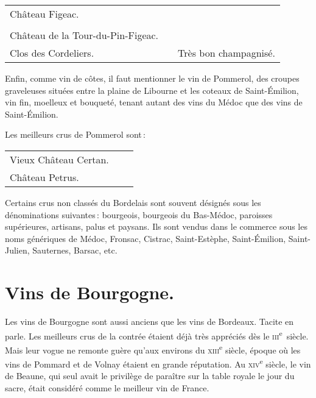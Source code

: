 \begin{longtable}{m{14em}m{8em}m{14em}}
  Château Figeac.                     &                 &                                                              \\
                                      &                 &                                                              \\
  Château de la Tour-du-Pin-Figeac.   &                 &                                                              \\
  Clos des Cordeliers.                &                 & Très bon champagnisé.                                        \\
\end{longtable}     
\normalsize

Enfin, comme vin de côtes, il faut mentionner le vin de Pommerol, des croupes
graveleuses situées entre la plaine de Libourne et les coteaux de
Saint-Émilion, vin fin, moelleux et bouqueté, tenant autant des vins du Médoc
que des vins de Saint-Émilion.

\medskip

Les meilleurs crus de Pommerol sont :

\scriptsize
\begin{longtable}{m{14em}m{8em}m{14em}}                                                   
  Vieux Château Certan.               &                 &                                                              \\
  Château Petrus.                     &                 &                                                              \\
\end{longtable}                                                                                             
\normalsize

Certains crus non classés du Bordelais sont souvent désignés sous les
dénominations suivantes : bourgeois, bourgeois du Bas-Médoc, paroisses
supérieures, artisans, palus et paysans. Ils sont vendus dans le commerce sous
les noms génériques de Médoc, Fronsac, Cistrac, Saint-Estèphe, Saint-Émilion,
Saint-Julien, Sauternes, Barsac, etc.

\section*{\centering Vins de Bourgogne.}

Les vins de Bourgogne sont aussi anciens que les vins de Bordeaux. Tacite en
parle. Les meilleurs crus de la contrée étaient déjà très appréciés dès le
\textsc{iii}\textsuperscript{e} siècle. Mais leur vogue ne remonte guère qu'aux
environs du \textsc{xiii}\textsuperscript{e} siècle, époque où les vins de
Pommard et de Volnay étaient en grande réputation. Au
\textsc{xiv}\textsuperscript{e} siècle, le vin de Beaune, qui seul avait le
privilège de paraître sur la table royale le jour du sacre, était considéré
comme le meilleur vin de France.

